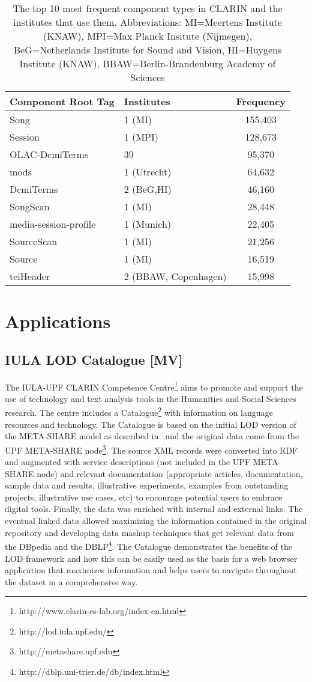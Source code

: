 \documentclass{llncs}
\begin{document}
{\begin{table}
\begin{center}
\begin{tabular}{l|lc}
Component Root Tag & Institutes & Frequency \\
\hline
Song & 1 (MI) & 155,403 \\
Session & 1 (MPI) & 128,673 \\
OLAC-DcmiTerms & 39 & 95,370 \\
mods & 1 (Utrecht)& 64,632 \\
DcmiTerms & 2 (BeG,HI) & 46,160 \\
SongScan & 1 (MI) & 28,448 \\
media-session-profile & 1 (Munich) & 22,405 \\
SourceScan & 1 (MI) & 21,256 \\
Source & 1 (MI) & 16,519 \\
teiHeader & 2 (BBAW, Copenhagen) & 15,998 \\
\end{tabular}
\end{center}
\caption{\label{tab:clarin-types}The top 10 most frequent component types in
CLARIN and the institutes that use them. Abbreviations: MI=Meertens Institute (KNAW),
MPI=Max Planck Insitute (Nijmegen), BeG=Netherlands Institute for Sound and Vision,
HI=Huygens Institute (KNAW), BBAW=Berlin-Brandenburg Academy of Sciences}
\end{table}
\section{Applications}
\label{sec:applications}
\subsection{IULA LOD Catalogue [MV]}
\label{sec:iulalod}
The IULA-UPF CLARIN Competence Centre\footnote{http://www.clarin-es-lab.org/index-en.html} aims to promote and support the use of technology and text analysis tools in the Humanities and Social Sciences research. The centre includes a Catalogue\footnote{http://lod.iula.upf.edu/} with information on language resources and technology. The Catalogue is based on the initial LOD version of the META-SHARE model as described in~\cite{Villegas2014} and the original data come from the UPF META-SHARE node\footnote{http://metashare.upf.edu}. The source XML records were converted into RDF and augmented with service descriptions (not included in the UPF META-SHARE node) and relevant documentation (appropriate articles, documentation, sample data and results, illustrative experiments, examples from outstanding projects, illustrative use cases, etc) to encourage potential users to embrace digital tools. Finally, the data was enriched with internal and external links. The eventual linked data allowed maximizing the information
contained in the original repository and developing data mashup techniques that get relevant data from the DBpedia and the DBLP\footnote{http://dblp.uni-trier.de/db/index.html}. The Catalogue demonstrates the benefits of the LOD framework and how this can be easily used as the basis for a web browser application that maximizes information and helps users to navigate throughout the dataset in a comprehensive way.

}
\end{document}

